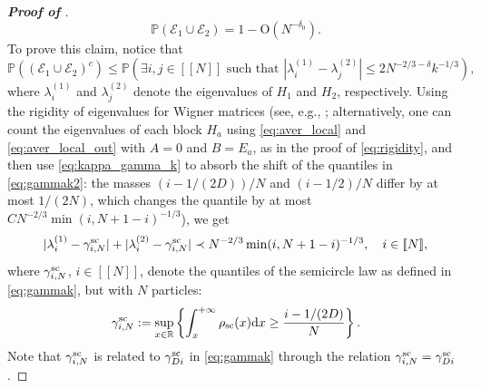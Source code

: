 \documentclass[10pt,reqno]{amsart}
\numberwithin{equation}{section}
\numberwithin{figure}{section}
\theoremstyle{plain} %
\theoremstyle{definition} %
\renewcommand{\txt}[1]{\text{\rm{#1}}}
\renewcommand{\P}{\mathbb{P}}
\newcommand{\R}{\mathbb{R}}
\newcommand{\dd}{\mathrm{d}}
\renewcommand{\geq}{\ge}
\newcommand{\qq}[1]{[\![{#1}]\!]}
\newcommand{\be}{\begin{equation}}
\newcommand{\ee}{\end{equation}}
\newcommand{\OO}{\mathrm{O}}
\numberwithin{equation}{section}
\begin{document}
\begin{proof}[\bf Proof of ]
\be\label{eq:probab12}
\P \left( \mathscr E_1\cup \mathscr E_2\right) = 1-\OO(N^{-\delta_0}).
\ee
To prove this claim, notice that 
$$ \P\left( (\mathscr E_1\cup \mathscr E_2)^c \right) \le \P \left( \exists i,j \in \qq{N} \text{ such that } |\lambda_i^{(1)}-\lambda_j^{(2)}|\le 2N^{-2/3-\delta}k^{-1/3}\right),$$
where $\lambda_i^{(1)}$ and $\lambda_j^{(2)}$ denote the eigenvalues of $H_1$ and $H_2$, respectively. Using the rigidity of eigenvalues for Wigner matrices (see, e.g., \cite[Theorem 2.2]{erdHos2012rigidity}; alternatively, one can count the eigenvalues of each block $H_a$ using \eqref{eq:aver_local} and \eqref{eq:aver_local_out} with $A=0$ and $B=E_a$, as in the proof of \eqref{eq:rigidity}, and then use \eqref{eq:kappa_gamma_k} to absorb the shift of the quantiles in \eqref{eq:gammak2}: the masses $(i-1/(2D))/N$ and $(i-1/2)/N$ differ by at most $1/(2N)$, which changes the quantile by at most $CN^{-2/3}\min(i,N+1-i)^{-1/3}$), we get
\be\label{rigidity12} |\lambda_i^{(1)}-\gamma_{i,N}^{\txt{sc}}|+|\lambda_i^{(2)}-\gamma_{i,N}^{\txt{sc}}| \prec N^{-2/3}\min(i,N+1-i)^{-1/3},\quad i\in \qq{N}, \ee
where $\gamma_{i,N}^{\txt{sc}}$, $i\in \qq{N}$, denote the quantiles of the semicircle law as defined in \eqref{eq:gammak}, but with $N$ particles: 
\be\label{eq:gammak2}
\gamma_{i,N}^{\txt{sc}}:=\sup_{x\in \R}\left\{\int_{x}^{+\infty}\rho_{\txt{sc}}(x)\dd x \geq \frac{i-1/(2D)}{N}\right\}.\ee
Note that $\gamma_{i,N}^{\txt{sc}}$ is related to $\gamma_{Di}^{\txt{sc}}$ in \eqref{eq:gammak} through the relation $\gamma_{i,N}^{\txt{sc}}=\gamma_{Di}^{\txt{sc}}$. 



\end{proof}
\end{document}

